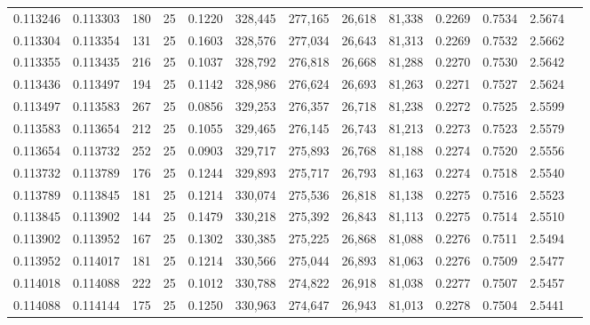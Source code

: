 \begin{tabular}{rrrrrrrrrrrrr}
0.113246 & 0.113303 &   180 &  25 &                                     0.1220 & 328,445 & 277,165 &  26,618 &  81,338 & 0.2269 & 0.7534 & 2.5674 \\
0.113304 & 0.113354 &   131 &  25 &                                     0.1603 & 328,576 & 277,034 &  26,643 &  81,313 & 0.2269 & 0.7532 & 2.5662 \\
0.113355 & 0.113435 &   216 &  25 &                                     0.1037 & 328,792 & 276,818 &  26,668 &  81,288 & 0.2270 & 0.7530 & 2.5642 \\
0.113436 & 0.113497 &   194 &  25 &                                     0.1142 & 328,986 & 276,624 &  26,693 &  81,263 & 0.2271 & 0.7527 & 2.5624 \\
0.113497 & 0.113583 &   267 &  25 &                                     0.0856 & 329,253 & 276,357 &  26,718 &  81,238 & 0.2272 & 0.7525 & 2.5599 \\
0.113583 & 0.113654 &   212 &  25 &                                     0.1055 & 329,465 & 276,145 &  26,743 &  81,213 & 0.2273 & 0.7523 & 2.5579 \\
0.113654 & 0.113732 &   252 &  25 &                                     0.0903 & 329,717 & 275,893 &  26,768 &  81,188 & 0.2274 & 0.7520 & 2.5556 \\
0.113732 & 0.113789 &   176 &  25 &                                     0.1244 & 329,893 & 275,717 &  26,793 &  81,163 & 0.2274 & 0.7518 & 2.5540 \\
0.113789 & 0.113845 &   181 &  25 &                                     0.1214 & 330,074 & 275,536 &  26,818 &  81,138 & 0.2275 & 0.7516 & 2.5523 \\
0.113845 & 0.113902 &   144 &  25 &                                     0.1479 & 330,218 & 275,392 &  26,843 &  81,113 & 0.2275 & 0.7514 & 2.5510 \\
0.113902 & 0.113952 &   167 &  25 &                                     0.1302 & 330,385 & 275,225 &  26,868 &  81,088 & 0.2276 & 0.7511 & 2.5494 \\
0.113952 & 0.114017 &   181 &  25 &                                     0.1214 & 330,566 & 275,044 &  26,893 &  81,063 & 0.2276 & 0.7509 & 2.5477 \\
0.114018 & 0.114088 &   222 &  25 &                                     0.1012 & 330,788 & 274,822 &  26,918 &  81,038 & 0.2277 & 0.7507 & 2.5457 \\
0.114088 & 0.114144 &   175 &  25 &                                     0.1250 & 330,963 & 274,647 &  26,943 &  81,013 & 0.2278 & 0.7504 & 2.5441 \\

\end{tabular}

